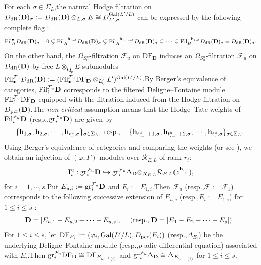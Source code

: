 \documentclass[10pt]{article}
\DeclareMathOperator{\Gal}{Gal}
\newcommand{\pcr}{{\rm pcr}}
\newcommand{\fil}{{\rm Fil}}
\newcommand{\df}{{\mathrm{DF}}}
\newcommand{\dr}{{\rm dR}}
\newcommand{\tee}{{{\otimes}_{\cR_{E,L}}}}
\newcommand{\gr}{{\rm gr}}
\newcommand{\hpi}{{{\mathbf{h}}}}
\newcommand{\Dpik}{{\mathbf{D}}}
\newcommand{\bQ}{{\mathbf{Q}}}
\newcommand{\bh}{{\mathbf{h}}}
\newcommand{\cR}{\mathcal R}
\newcommand{\cF}{\mathcal F}
\begin{document}
For each $\sigma\in \Sigma_L$,\;the natural Hodge filtration on $D_{\dr}(\Dpik)_{\sigma}:=D_{\dr}(\Dpik)\otimes_{L,\sigma}E\cong D_{L',\sigma}^{\Gal(L'/L)}$ can be expressed by the following complete flag :
\[\fil^{\bullet}_{H}D_{\dr}(\Dpik)_{\sigma}: \ 0 \subsetneq \fil^{-\hpi_{n,\sigma}}_{H} D_{\dr}(\Dpik)_{\sigma} \subsetneq \fil^{-\hpi_{n-1,\sigma}}_{H}D_{\dr}(\Dpik)_{\sigma} \subsetneq \cdots \subsetneq \fil^{{-\hpi_{1,\sigma}}}_{H}D_{\dr}(\Dpik)_{\sigma}=D_{\dr}(\Dpik)_{\sigma}.\]
On the other hand, the $\Omega_{S^u_0}$-filtration $\cF_u$ on $\df_{\Dpik}$ induces an $\Omega_{S^u_0}$-filtration $\cF_u$ on $D_{\dr}(\Dpik)$ by free $L\otimes_{\bQ_p}E$-submodules $\fil_{\bullet}^{\cF_u}D_{\dr}(\Dpik):=(\fil_{\bullet}^{\cF_u}\df_{\Dpik}\otimes_{L_0'}L')^{\Gal(L'/L)}$.\;By Berger's equivalence of categories, $\fil_{i}^{\cF_u}\Dpik$ corresponds to the filtered Deligne--Fontaine module $\fil_{i}^{\cF_u} \df_{\Dpik}$ equipped with the filtration induced from the Hodge filtration on $D_{\pcr}(\Dpik)$.\;The \textit{non-critical} assumption means that the Hodge--Tate weights of $\fil_{i}^{\cF_u}\Dpik$ (resp.,\;$\gr_{i}^{\cF_u} \Dpik$) are given by
\begin{equation}
	\begin{aligned}
		&\{\hpi_{1,\sigma},\hpi_{2,\sigma},\cdots,\hpi_{t_i^u,\sigma}\}_{\sigma\in \Sigma_L},\;
		\text{resp.,\;}&\{\hpi_{t^u_{i-1}+1,\sigma},\hpi_{t^u_{i-1}+2,\sigma},\cdots,\hpi_{t^u_i,\sigma}\}_{\sigma\in \Sigma_L}.\;
	\end{aligned}
\end{equation}
Using Berger's equivalence of categories \cite[Theorem A]{berger2008equations} and comparing the weights (or see \cite[(2.4)]{Ding2021}), we obtain an injection of $(\varphi,\Gamma)$-modules over $\cR_{E,L}$ of rank $r_i$:
\begin{equation}\label{Dpikinjectionu}
	\mathbf{I}^u_{i}:\gr_{i}^{\cF_u} \Dpik \hookrightarrow \gr^{\cF_u}_{i}{\Delta_\Dpik}\tee \cR_{E,L}(z^{\bh_{t^u_i}}),
\end{equation}
for $i=1,\cdots,s$.\;Put $E_{u,i}:=\gr_{i}^{\cF_u}\Dpik$ and $E_{i}:=E_{1,i}$.\;Then $\cF_u$ (resp.,\;$\cF:=\cF_1$) corresponds to the following successive  extension of $E_{u,i}$ (resp.,\;$E_{i}:=E_{1,i}$) for $1\leq i\leq s$ :
\begin{equation}\label{omegafilforu}
\Dpik=[E_{u,1}-E_{u,2}-\cdots-E_{u,s}],\;\quad (\text{resp.,\;}\Dpik=[E_{1}-E_{2}-\cdots-E_{s}]).\;
\end{equation}
For $1\leq i\leq s$, let $\df_{E_i}:=(\varphi_i,\Gal(L'/L),D_{\pcr}(E_i))$ (resp.,\;$\Delta_{E_i}$) be the underlying Deligne--Fontaine module (resp.,\;$p$-adic differential equation) associated with $E_i$.\;Then $\gr_{i}^{\cF_u} \df_{\Dpik}\cong \df_{E_{u^{-1}(i)}}$ and $\gr^{\cF_u}_{i}{\Delta_\Dpik}\cong \Delta_{E_{u^{-1}(i)}}$ for $1\leq i\leq s$.\;
\end{document}

